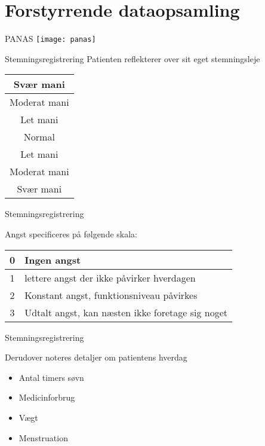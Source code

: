 \section{Forstyrrende dataopsamling}

{ %
\begin{frame}{PANAS} %
\texttt{[image: panas]}
	
\end{frame}}

{ %
	\begin{frame}{Stemningsregistrering} %
		Patienten reflekterer over sit eget stemningsleje
		
		\begin{center}
		\begin{tabular}{|c|}
			\hline \cellcolor{red!90} Svær mani \\ 
			\hline \cellcolor{red!60} Moderat mani \\ 
			\hline \cellcolor{red!30} Let mani \\ 
			\hline \cellcolor{yellow!70} Normal \\ 
			\hline \cellcolor{blue!30} Let mani \\ 
			\hline \cellcolor{blue!60} Moderat mani \\ 
			\hline \cellcolor{blue!90} Svær mani \\ 
			\hline 
		\end{tabular} 
		\end{center}
	\end{frame}}
	
{ %
	\begin{frame}{Stemningsregistrering} %

		Angst specificeres på følgende skala:
		\begin{tabular}{| c | l|}
			\hline 0 & Ingen angst \\ 
			\hline 1 & lettere angst der ikke påvirker hverdagen\\ 
			\hline 2 & Konstant angst, funktionsniveau påvirkes\\ 
			\hline 3 & Udtalt angst, kan næsten ikke foretage sig noget\\
			\hline
		\end{tabular} 
	\end{frame}}
	
{ %
	\begin{frame}{Stemningsregistrering} %
		
		Derudover noteres detaljer om patientens hverdag
		\begin{itemize}
			\item Antal timers søvn
			\item Medicinforbrug
			\item Vægt
			\item Menstruation
		\end{itemize}
	\end{frame}}
	
